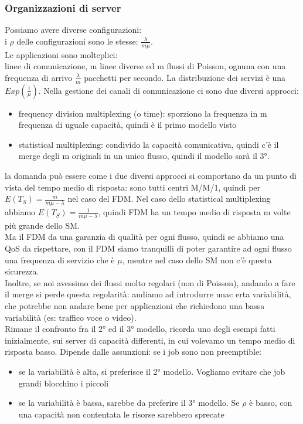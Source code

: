 \documentclass{article}
\begin{document}
\subsubsection{Organizzazioni di server} 
Possiamo avere diverse configurazioni:\\
i $\rho$ delle configurazioni sono le stesse: $\frac{\lambda}{m \mu}$.\\ Le applicazioni sono molteplici:
\\ linee di comunicazione, m linee diverse ed m flussi di Poisson, ognuna con una frequenza di arrivo $\frac{\lambda}{m}$ pacchetti per secondo. La distribuzione dei servizi è una $Exp(\frac{1}{\mu})$. Nella gestione dei canali di comunicazione ci sono due diversi approcci:
\begin{itemize}
\item frequency division multiplexing (o time): sporziono la frequenza in m frequenza di uguale capacità, quindi è il primo modello visto
\item statistical multiplexing: condivido la capacità comunicativa, quindi c'è il merge degli m originali in un unico flusso, quindi il modello sarà il 3°.
\end{itemize}
la domanda può essere come i due diversi approcci si comportano da un punto di vista del tempo medio di risposta: sono tutti centri M/M/1, quindi per $E(T_S) = \frac{m}{m \mu - \lambda}$ nel caso del FDM. Nel caso dello statistical multiplexing abbiamo $E(T_S) = \frac{1}{m \mu - \lambda}$, quindi FDM ha un tempo medio di risposta m volte più grande dello SM.\\ Ma il FDM da una garanzia di qualità per ogni flusso, quindi se abbiamo una QoS da rispettare, con il FDM siamo tranquilli di poter garantire ad ogni flusso una frequenza di servizio che è $\mu$, mentre nel caso dello SM non c'è questa sicurezza.\\ Inoltre, se noi avessimo dei flussi molto regolari (non di Poisson), andando a fare il merge si perde questa regolarità: andiamo ad introdurre unac erta variabilità, che potrebbe non andare bene per applicazioni che richiedono una bassa variabilità (es: traffico voce o video).\\ Rimane il confronto fra il 2° ed il 3° modello, ricorda uno degli esempi fatti inizialmente, sui server di capacità differenti, in cui volevamo un tempo medio di risposta basso. Dipende dalle assunzioni: se i job sono non preemptible:
\begin{itemize}
\item se la variabilità è alta, si preferisce il 2° modello. Vogliamo evitare che job grandi blocchino i piccoli
\item se la variabilità è bassa, sarebbe da preferire il 3° modello. Se $\rho$ è basso, con una capacità non contentata le risorse sarebbero sprecate
\end{itemize}
\end{document}
